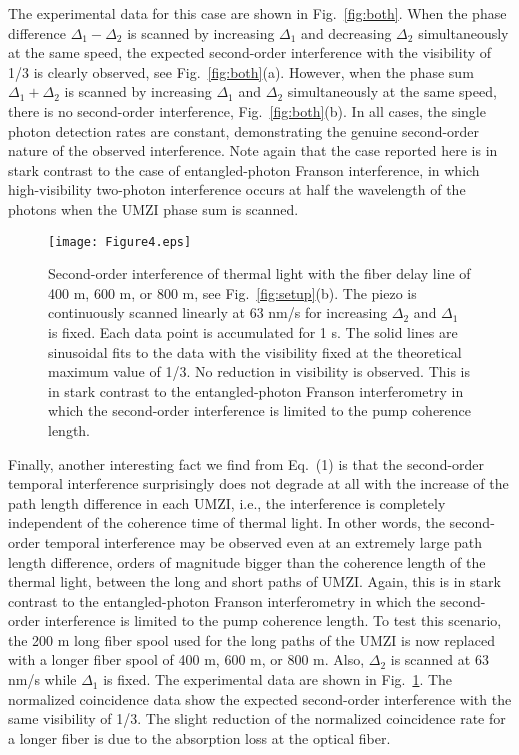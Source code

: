 \documentclass[aps,prl,reprint,showpacs,superscriptaddress]{revtex4-1}
\begin{document}
The experimental data for this case are shown in Fig.~\ref{fig:both}. When the phase difference $\Delta_1-\Delta_2$ is scanned by increasing $\Delta_1$ and decreasing $\Delta_2$ simultaneously at the same speed, the expected second-order interference with the visibility of 1/3 is clearly observed, see Fig.~\ref{fig:both}(a). However, when the phase sum $\Delta_1+\Delta_2$ is scanned by increasing $\Delta_1$ and $\Delta_2$ simultaneously at the same speed, there is no second-order interference, Fig.~\ref{fig:both}(b). In all cases, the single photon detection rates are constant, demonstrating the genuine second-order nature of the observed interference. Note again that the case reported here is in stark contrast to the case of entangled-photon Franson interference, in which high-visibility two-photon interference occurs at  half the wavelength of the photons when the UMZI phase sum is scanned.  



\begin{figure}[t]
\texttt{[image: Figure4.eps]}
\caption{Second-order interference of thermal light with the fiber delay line of 400 m, 600 m, or 800 m, see Fig.~\ref{fig:setup}(b). The piezo is continuously scanned linearly at 63 nm/s for increasing $\Delta_2$ and $\Delta_1$ is fixed. Each data point is accumulated for 1 s. The solid lines are sinusoidal fits to the data with the visibility fixed at the theoretical maximum value of 1/3. No reduction in visibility is observed. This is in stark contrast to the entangled-photon Franson interferometry in which the second-order interference is limited to the pump coherence length.} \label{fig:long}
\end{figure}


Finally, another interesting fact we find from Eq.~(1) is that the second-order temporal interference surprisingly does not degrade at all with the increase of the path length difference in each UMZI, i.e., the interference is completely independent of the coherence time of thermal light. In other words, the second-order temporal interference may be observed even at an extremely large path length difference, orders of magnitude bigger  than the coherence length of the thermal light, between the long and short paths of UMZI. Again, this is in stark contrast to the entangled-photon Franson interferometry in which the second-order interference is limited to the pump coherence length.  To test this scenario, the 200 m long fiber spool used for the long paths of the UMZI is now replaced with a longer fiber spool of 400 m, 600 m, or 800 m. Also, $\Delta_2$ is scanned at 63 nm/s while $\Delta_1$ is fixed. The experimental data are shown in Fig.~\ref{fig:long}. The normalized coincidence data show the expected second-order interference with the same visibility of 1/3. The slight reduction of the normalized coincidence rate for a longer fiber is due to the absorption loss at the optical fiber. 
\end{document}
